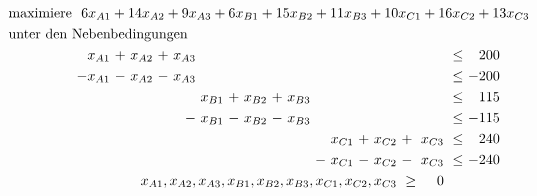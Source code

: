 \documentclass [a4paper,11pt]{article}
\begin{document}
\begin{enumerate}
\begin{enumerate}
                \begin{align*}
                \begin{alignedat}{12}
                & \text{maximiere } \rlap{ $ 6x_{A1} + 14x_{A2} + 9x_{A3} + 6x_{B1} + 15x_{B2} + 11x_{B3} + 10x_{C1} + 16x_{C2} + 13x_{C3} $} &&&&&&&&&&&&&&&&& \\
                & \rlap{unter den Nebenbedingungen} & & & & & & & & & & & & & & & & & \\
                &&  x_{A1} &\ + &\ x_{A2} &\ + &\ x_{A3} &    &  & & & & & & & & & & &\ \leq &\  200 \\
                && -x_{A1} &\ - &\ x_{A2} &\ - &\ x_{A3} &    &  & & & & & & & & & & &\ \leq &\ -200 \\
                &&  &  &  & & &\ x_{B1} &\ + &\ x_{B2} &\ + &\ x_{B3} & & & & & & & &\ \leq &\ 115 \\
                &&  &  &  & &\ - &\ x_{B1} &\ - &\ x_{B2} &\ - &\ x_{B3} & & & & & & & &\ \leq &\ -115 \\
                &&  &  &  & &  & & & & & & & &\ x_{C1} &\ + &\ x_{C2} &\ + &\ x_{C3} &\ \leq &\ 240 \\
                &&  &  &  & &  & & & & & & &\ - &\ x_{C1} &\ - &\ x_{C2} &\ - &\ x_{C3} &\ \leq &\ -240 \\
                && & & & & & & & & & & & & & & \llap{$x_{A1}, x_{A2}, x_{A3},x_{B1}, x_{B2}, x_{B3}, x_{C1}, x_{C2}, x_{C3}$} &\ \geq &\ 0
                \end{alignedat}
                \end{align*}

        \end{enumerate}

    \end{enumerate}
\end{document}
